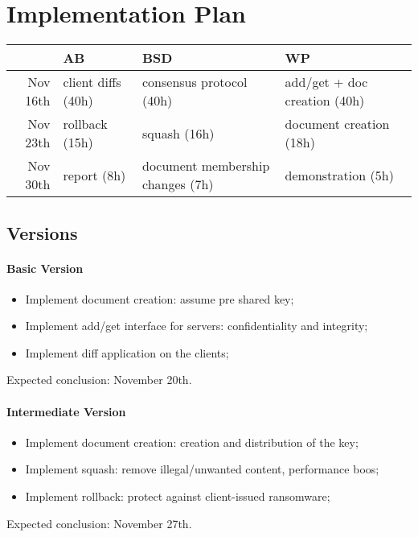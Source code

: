 \section{Implementation Plan}

\begin{table*}[ht]
    \centering
    \label{Effort Commitment}
    \begin{tabular}{r|l|l|l}
                 & AB                  & BSD                               & WP \\
        \hline
        Nov 16th & client diffs (40h)  & consensus protocol (40h)          & add/get + doc creation (40h) \\
        Nov 23th & rollback (15h)      & squash (16h)                      & document creation (18h) \\
        Nov 30th & report (8h)         & document membership changes (7h)  & demonstration (5h) \\
    \end{tabular}
\end{table*}

\subsection{Versions}

\paragraph{Basic Version} {
    \begin{itemize}
        \setlength{\itemsep}{0pt}
        \setlength{\parskip}{0pt}
        \setlength{\parsep}{0pt}
        \item Implement document creation: assume pre shared key;
        \item Implement add/get interface for servers: confidentiality and integrity;
        \item Implement diff application on the clients;
    \end{itemize}
    Expected conclusion: November 20th.
}

\paragraph{Intermediate Version} {
    \begin{itemize}
        \setlength{\itemsep}{0pt}
        \setlength{\parskip}{0pt}
        \setlength{\parsep}{0pt}
        \item Implement document creation: creation and distribution of the key;
        \item Implement squash: remove illegal/unwanted content, performance boos;
        \item Implement rollback: protect against client-issued ransomware;
    \end{itemize}
    Expected conclusion: November 27th.
}

